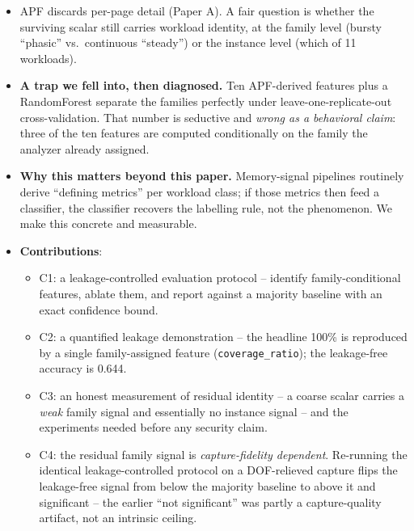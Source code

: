 \documentclass[conference]{IEEEtran}
\begin{document}
\begin{itemize}
  \item APF discards per-page detail (Paper A). A fair question is whether the
        surviving scalar still carries workload identity, at the family level
        (bursty ``phasic'' vs.\ continuous ``steady'') or the instance level
        (which of 11 workloads).
  \item \textbf{A trap we fell into, then diagnosed.} Ten APF-derived features
        plus a RandomForest separate the families perfectly under
        leave-one-replicate-out cross-validation. That number is seductive and
        \emph{wrong as a behavioral claim}: three of the ten features are
        computed conditionally on the family the analyzer already assigned.
  \item \textbf{Why this matters beyond this paper.} Memory-signal pipelines
        routinely derive ``defining metrics'' per workload class; if those
        metrics then feed a classifier, the classifier recovers the labelling
        rule, not the phenomenon. We make this concrete and measurable.
  \item \textbf{Contributions}:
    \begin{itemize}
      \item C1: a leakage-controlled evaluation protocol -- identify
            family-conditional features, ablate them, and report against a
            majority baseline with an exact confidence bound.
      \item C2: a quantified leakage demonstration -- the headline 100\% is
            reproduced by a single family-assigned feature
            (\texttt{coverage\_ratio}); the leakage-free accuracy is 0.644.
      \item C3: an honest measurement of residual identity -- a coarse scalar
            carries a \emph{weak} family signal and essentially no instance
            signal -- and the experiments needed before any security claim.
      \item C4: the residual family signal is \emph{capture-fidelity dependent}.
            Re-running the identical leakage-controlled protocol on a DOF-relieved
            capture flips the leakage-free signal from below the majority baseline
            to above it and significant -- the earlier ``not significant'' was
            partly a capture-quality artifact, not an intrinsic ceiling.

\end{itemize}
\end{itemize}
\end{document}
